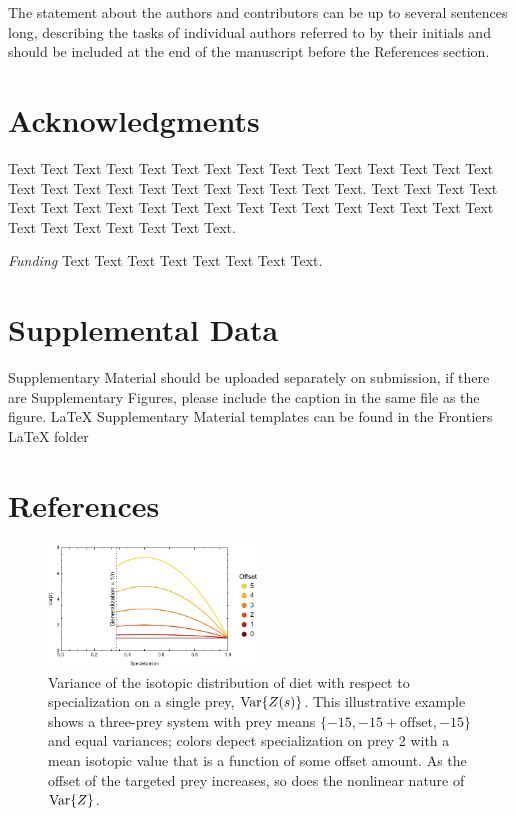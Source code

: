 \documentclass{frontiersSCNS}
\begin{document}
The statement about the authors and contributors can be up to several sentences long, describing the tasks of individual authors referred to by their initials and should be included at the end of the manuscript before the References section.


\section*{Acknowledgments}
Text Text Text Text Text Text  Text Text Text Text Text Text Text Text  Text Text Text Text Text Text Text Text Text  Text Text Text. Text Text Text Text Text Text  Text Text Text Text Text Text Text Text  Text Text Text Text Text Text Text Text Text  Text Text Text. 


\textit{Funding\textcolon} Text Text Text Text Text Text  Text Text.

\section*{Supplemental Data}
Supplementary Material should be uploaded separately on submission, if there are Supplementary Figures, please include the caption in the same file as the figure. LaTeX Supplementary Material templates can be found in the Frontiers LaTeX folder

\newpage
\section*{References}




\newpage


\begin{figure}[h!]
\centering
\includegraphics[width=0.5\textwidth]{fig_var.pdf}
\caption{
Variance of the isotopic distribution of diet with respect to specialization on a single prey, ${\rm Var}\{Z(s)\}$.
This illustrative example shows a three-prey system with prey means $\{-15,-15+\mbox{offset},-15\}$ and equal variances; colors depect specialization on prey 2 with a mean isotopic value that is a function of some offset amount.
As the offset of the targeted prey increases, so does the nonlinear nature of ${\rm Var}\{Z\}$.
}
  \label{figvar}
\end{figure}
\end{document}
